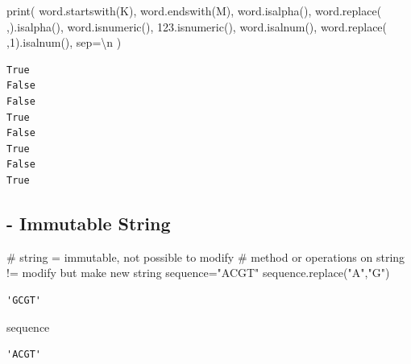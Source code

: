 \documentclass[
  letterpaper,
  DIV=11,
  numbers=noendperiod]{scrreprt}
\newenvironment{Shaded}{\begin{snugshade}}{\end{snugshade}}
\newcommand{\BuiltInTok}[1]{\textcolor[rgb]{0.00,0.23,0.31}{#1}}
\newcommand{\CharTok}[1]{\textcolor[rgb]{0.13,0.47,0.30}{#1}}
\newcommand{\CommentTok}[1]{\textcolor[rgb]{0.37,0.37,0.37}{#1}}
\newcommand{\NormalTok}[1]{\textcolor[rgb]{0.00,0.23,0.31}{#1}}
\newcommand{\OperatorTok}[1]{\textcolor[rgb]{0.37,0.37,0.37}{#1}}
\newcommand{\StringTok}[1]{\textcolor[rgb]{0.13,0.47,0.30}{#1}}
\begin{document}
\begin{Shaded}
\begin{Highlighting}[]
\BuiltInTok{print}\NormalTok{(}
\NormalTok{    word.startswith(}\StringTok{\textquotesingle{}K\textquotesingle{}}\NormalTok{),}
\NormalTok{    word.endswith(}\StringTok{\textquotesingle{}M\textquotesingle{}}\NormalTok{),}
\NormalTok{    word.isalpha(),}
\NormalTok{    word.replace(}\StringTok{\textquotesingle{} \textquotesingle{}}\NormalTok{,}\StringTok{\textquotesingle{}\textquotesingle{}}\NormalTok{).isalpha(),}
\NormalTok{    word.isnumeric(),}
    \StringTok{\textquotesingle{}123\textquotesingle{}}\NormalTok{.isnumeric(),}
\NormalTok{    word.isalnum(),}
\NormalTok{    word.replace(}\StringTok{\textquotesingle{} \textquotesingle{}}\NormalTok{,}\StringTok{\textquotesingle{}1\textquotesingle{}}\NormalTok{).isalnum(),}
\NormalTok{    sep}\OperatorTok{=}\StringTok{\textquotesingle{}}\CharTok{\textbackslash{}n}\StringTok{\textquotesingle{}}
\NormalTok{)}
\end{Highlighting}
\end{Shaded}

\begin{verbatim}
True
False
False
True
False
True
False
True
\end{verbatim}

\subsection{- Immutable String}\label{immutable-string}

\begin{Shaded}
\begin{Highlighting}[]
\CommentTok{\# string = immutable, not possible to modify}
\CommentTok{\# method or operations on string != modify but make new string}
\NormalTok{sequence}\OperatorTok{=}\StringTok{"ACGT"}
\NormalTok{sequence.replace(}\StringTok{"A"}\NormalTok{,}\StringTok{"G"}\NormalTok{)}
\end{Highlighting}
\end{Shaded}

\begin{verbatim}
'GCGT'
\end{verbatim}

\begin{Shaded}
\begin{Highlighting}[]
\NormalTok{sequence}
\end{Highlighting}
\end{Shaded}

\begin{verbatim}
'ACGT'
\end{verbatim}
\end{document}
